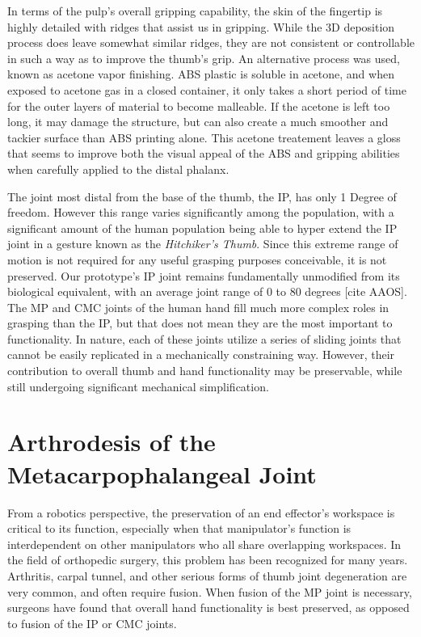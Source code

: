 \documentclass[letterpaper, 10 pt, conference]{ieeeconf}  %
\begin{document}
In terms of the pulp's overall gripping capability, the skin of the fingertip is highly detailed with ridges that assist us in gripping. While the 3D deposition process does leave somewhat similar ridges, they are not consistent or controllable in such a way as to improve the thumb's grip. An alternative process was used, known as acetone vapor finishing. ABS plastic is soluble in acetone, and when exposed to acetone gas in a closed container, it only takes a short period of time for the outer layers of material to become malleable. If the acetone is left too long, it may damage the structure, but can also create a much smoother and tackier surface than ABS printing alone. This acetone treatement leaves a gloss that seems to improve both the visual appeal of the ABS and gripping abilities when carefully applied to the distal phalanx.

The joint most distal from the base of the thumb, the IP, has only 1 Degree of freedom. However this range varies significantly among the population, with a significant amount of the human population being able to hyper extend the IP joint in a gesture known as the \emph{Hitchiker's Thumb}. Since this extreme range of motion is not required for any useful grasping purposes conceivable, it is not preserved. Our prototype's IP joint remains fundamentally unmodified from its biological equivalent, with an average joint range of 0 to 80 degrees [cite
 AAOS]. The MP and CMC joints of the human hand fill much more complex roles in grasping than the IP, but that does not mean they are the most important to functionality. In nature, each of these joints utilize a series of sliding joints that cannot be easily replicated in a mechanically constraining way. However, their contribution to overall thumb and hand functionality may be preservable, while still undergoing significant mechanical simplification.

\section{Arthrodesis of the Metacarpophalangeal Joint}\label{concepts}

From a robotics perspective, the preservation of an end effector's workspace is critical to its function, especially when that manipulator's function is interdependent on other manipulators who all share overlapping workspaces. In the field of orthopedic surgery, this problem has been recognized for many years. Arthritis, carpal tunnel, and other serious forms of thumb joint degeneration are very common, and often require fusion. When fusion of the MP joint is necessary, surgeons have found that overall hand functionality is best preserved, as opposed to fusion of the IP or CMC joints.
\end{document}
